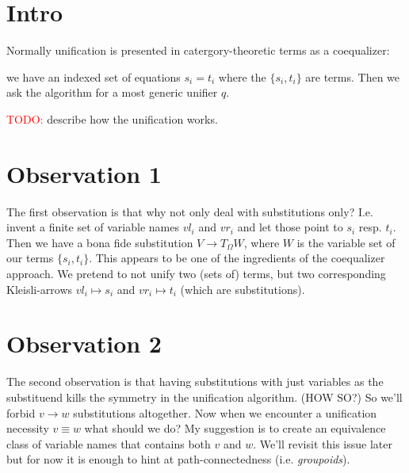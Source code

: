 \documentclass{article}
\newcommand \todo[1] {\textcolor{red}{TODO: }#1}
\begin{document}
\section {Intro}
Normally unification is presented in catergory-theoretic terms as a coequalizer:

we have an indexed set of equations $s_i = t_i$ where the $\{s_i, t_i\}$ are terms.
Then we ask the algorithm for a most generic unifier $q$.

\todo {describe how the unification works.}

\section {Observation 1}
The first observation is that why not only deal with substitutions only? I.e. invent a finite set of variable names $vl_i$ and $vr_i$ and let those point to $s_i$ resp. $t_i$. Then we have a bona fide substitution $V \to T_{\Omega}W$, where $W$ is the variable set of our terms $\{s_i, t_i\}$. This appears to be one of the ingredients of the coequalizer approach. We pretend to not unify two (sets of) terms, but two corresponding Kleisli-arrows $vl_i \mapsto s_i$ and $vr_i \mapsto t_i$ (which are substitutions).

\section {Observation 2}
The second observation is that having substitutions with just variables as the substituend kills the symmetry in the unification algorithm. (HOW SO?) So we'll forbid $v \to w$ substitutions altogether. Now when we encounter a unification necessity $v \equiv w$ what should we do?
My suggestion is to create an equivalence class of variable names that contains both $v$ and $w$. We'll revisit this issue later but for now it is enough to hint at path-connectedness (i.e. \emph{groupoids}).
\end{document}
